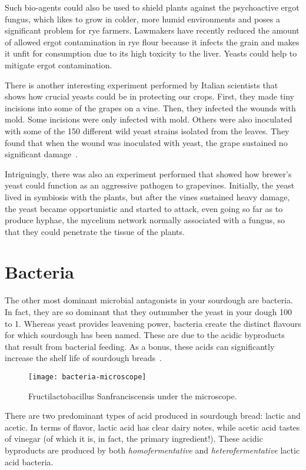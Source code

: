 Such bio-agents could also be used to shield plants against the psychoactive
ergot fungus, which likes to grow in colder, more humid environments and
poses a significant problem for rye farmers.
Lawmakers have recently reduced the amount of allowed ergot contamination in
rye flour because it infects the grain and makes it unfit for consumption due
to its high toxicity to the liver. Yeasts could help to mitigate ergot contamination.

There is another interesting experiment performed by Italian scientists that
shows how crucial yeasts could be in protecting our crops. First, they made
tiny incisions into some of the grapes on a vine. Then, they infected the
wounds with mold. Some incisions were only infected with mold. Others were also
inoculated with some of the 150 different wild yeast strains isolated from the
leaves. They found that when the wound was inoculated with yeast, the grape
sustained no significant damage~\cite{yeasts+biocontrol+agent}.

Intriguingly, there was also an experiment performed that showed how brewer's
yeast could function as an aggressive pathogen to grapevines. Initially, the
yeast lived in symbiosis with the plants, but after the vines sustained heavy
damage, the yeast became opportunistic and started to attack, even going so far
as to produce hyphae, the mycelium network normally associated with a fungus,
so that they could penetrate the tissue of the plants.

\section{Bacteria}

The other most dominant microbial antagonists in your sourdough are bacteria.
In fact, they are so dominant that they outnumber the yeast in your dough 100
to 1. Whereas yeast provides leavening power, bacteria create the distinct
flavours for which sourdough has been named. These are due to the acidic
byproducts that result from bacterial feeding. As a bonus, these acids
can significantly increase the shelf life of sourdough
breads~\cite{shelflife+acidity}.

\begin{figure}
  \texttt{[image: bacteria-microscope]}
  \caption{Fructilactobacillus Sanfranciscensis under the microscope.}%
  \label{lactobacillus-franciscensis-microscope}
\end{figure}

There are two predominant types of acid produced in sourdough bread: lactic and
acetic. In terms of flavor, lactic acid has clear dairy notes, while acetic
acid tastes of vinegar (of which it is, in fact, the primary ingredient!). These
acidic byproducts are produced by both \emph{homofermentative} and
\emph{heterofermentative} lactic acid bacteria.

